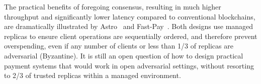 \documentclass[9pt, oneside]{article}   	%
\begin{document}
The practical benefits of foregoing consensus, resulting in much higher throughput and significantly lower latency compared to conventional blockchains, are dramatically illustrated by Astro~\cite{collins2020broadcast-payment} and Fast-Pay~\cite{baudet2020fastpay}. Both designs use managed replicas to ensure client operations are sequentially ordered, and therefore prevent overspending, even if any number of clients or less than 1/3 of replicas are adversarial (Byzantine). It is still an open question of how to design practical payment systems that would work in open adversarial settings, without resorting to 2/3 of trusted replicas within a managed environment.




\end{document}
